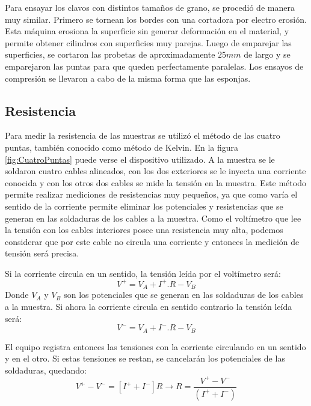\documentclass[a4paper,12pt,fleqn,twoside,openany]{book}
\begin{document}
Para ensayar los clavos con distintos tamaños de grano, se procedió de manera muy similar. Primero se tornean los bordes con una cortadora por electro erosión. Esta máquina erosiona la superficie sin generar deformación en el material, y permite obtener cilindros con superficies muy parejas. Luego de emparejar las superficies, se cortaron las probetas de aproximadamente $25 mm$ de largo y se emparejaron las puntas para que queden perfectamente paralelas. 
Los ensayos de compresión se llevaron a cabo de la misma forma que las esponjas. 
 

\subsection{Resistencia} \label{CuatroPuntas}


Para medir la resistencia de las muestras se utilizó el método de las cuatro puntas, también conocido como método de Kelvin. En la figura 
\ref{fig:CuatroPuntas} puede 
verse el dispositivo utilizado. A la muestra se le soldaron cuatro cables alineados, con los dos exteriores se le inyecta una corriente conocida y con los 
otros dos cables se mide la tensión en la muestra. Este método permite realizar mediciones de resistencias muy pequeños, ya que como varía
el sentido de la corriente permite eliminar los potenciales y resistencias que se generan en las soldaduras de los cables a la muestra.
Como el voltímetro que lee la tensión con los cables interiores posee una resistencia muy alta, podemos considerar que por este cable no circula una corriente
y entonces la medición de tensión será precisa. 

Si la corriente circula en un sentido, la tensión leída por el voltímetro será:
\begin{equation}
 V^+= V_A +I^+ . R - V_B 
\end{equation}
Donde $V_A$ y $V_B$ son los potenciales que se generan en las soldaduras de los cables a la muestra. Si ahora la corriente circula en sentido contrario la tensión leída será:
\begin{equation}
 V^-= V_A +I^- . R - V_B 
\end{equation}

El equipo registra entonces las tensiones con la corriente circulando en un sentido y en el otro. Si estas tensiones se restan, se cancelarán los potenciales 
de las soldaduras, quedando:  
\begin{equation}
 V^+ - V^-= [I^+ + I^-] R \longrightarrow R=\frac{V^+ - V^-}{(I^+ + I^-)}
\end{equation}
\end{document}
